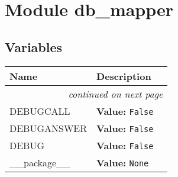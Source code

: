 %
%
%


\section{Module db\_mapper}

    \label{db_mapper}


  \subsection{Variables}

    \vspace{-1cm}
\hspace{\varindent}\begin{longtable}{|p{\varnamewidth}|p{\vardescrwidth}|l}
\cline{1-2}
\cline{1-2} \centering \textbf{Name} & \centering \textbf{Description}& \\
\cline{1-2}
\endhead\cline{1-2}\multicolumn{3}{r}{\small\textit{continued on next page}}\\\endfoot\cline{1-2}
\endlastfoot\raggedright D\-E\-B\-U\-G\-C\-A\-L\-L\- & \raggedright \textbf{Value:} 
{\tt False}&\\
\cline{1-2}
\raggedright D\-E\-B\-U\-G\-A\-N\-S\-W\-E\-R\- & \raggedright \textbf{Value:} 
{\tt False}&\\
\cline{1-2}
\raggedright D\-E\-B\-U\-G\- & \raggedright \textbf{Value:} 
{\tt False}&\\
\cline{1-2}
\raggedright \_\-\_\-p\-a\-c\-k\-a\-g\-e\-\_\-\_\- & \raggedright \textbf{Value:} 
{\tt None}&\\
\cline{1-2}
\end{longtable}



